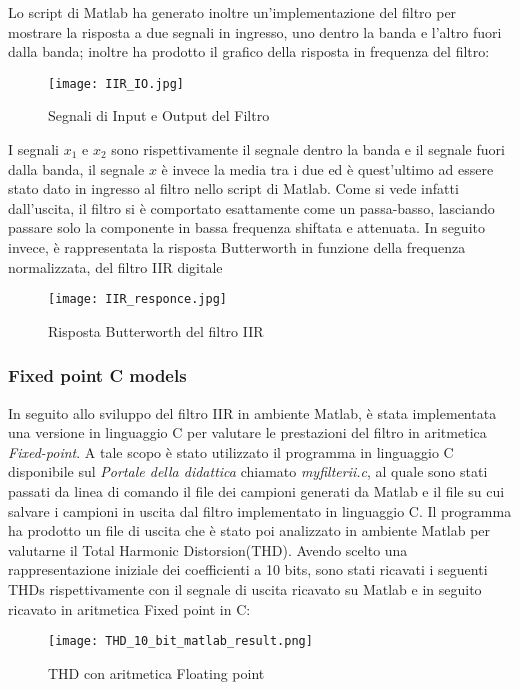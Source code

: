Lo script di Matlab ha generato inoltre un'implementazione del filtro per mostrare la risposta a due segnali in ingresso, uno dentro la banda e l'altro fuori dalla banda; inoltre ha prodotto il grafico della risposta in frequenza del filtro:
\begin{figure}[H]
\centering
\texttt{[image: IIR\_IO.jpg]}
\caption{Segnali di Input e Output del Filtro}
\label{fig:IO_signals}

\end{figure}
I segnali $x_{1}$ e $x_{2}$ sono rispettivamente il segnale dentro la banda e il segnale fuori dalla banda, il segnale $x$ è invece la media tra i due ed è quest'ultimo ad essere stato dato in ingresso al filtro nello script di Matlab. Come si vede infatti dall'uscita, il filtro si è comportato esattamente come un passa-basso, lasciando passare solo la componente in bassa frequenza shiftata e attenuata.
In seguito invece, è rappresentata la risposta Butterworth in funzione della frequenza normalizzata, del filtro IIR digitale
\begin{figure}[H]
\centering
\texttt{[image: IIR\_responce.jpg]}
\caption{Risposta Butterworth del filtro IIR}
\label{fig:Butterworth}
\end{figure}

\subsubsection{Fixed point C models}

In seguito allo sviluppo del filtro IIR in ambiente Matlab, è stata implementata una versione in linguaggio C per valutare le prestazioni del filtro in aritmetica \textit{Fixed-point}. A tale scopo è stato utilizzato il programma in linguaggio C disponibile sul \textit{Portale della didattica} chiamato \textit{myfilterii.c}, al quale sono stati passati da linea di comando il file dei campioni generati da Matlab e il file su cui salvare i campioni in uscita dal filtro implementato in linguaggio C. Il programma ha prodotto un file di uscita che è stato poi analizzato in ambiente Matlab per valutarne il Total Harmonic Distorsion(THD). Avendo scelto una rappresentazione iniziale dei coefficienti a 10 bits, sono stati ricavati i seguenti THDs rispettivamente con il segnale di uscita ricavato su Matlab e in seguito ricavato in aritmetica Fixed point in C:

\begin{figure}[H]
\centering
\texttt{[image: THD\_10\_bit\_matlab\_result.png]}
\caption{THD con aritmetica Floating point}
\label{fig:THD_10_bit_FL_P}
\end{figure}

